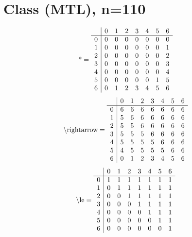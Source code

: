 \documentclass[11pt]{article}
\begin{document}
\section{Class (MTL), n=110}
\[\text{*} = 
\begin{array}{r | r r r r r r r}
 & 0 & 1 & 2 & 3 & 4 & 5 & 6 \\ \hline
0 & 0 & 0 & 0 & 0 & 0 & 0 & 0 \\
1 & 0 & 0 & 0 & 0 & 0 & 0 & 1 \\
2 & 0 & 0 & 0 & 0 & 0 & 0 & 2 \\
3 & 0 & 0 & 0 & 0 & 0 & 0 & 3 \\
4 & 0 & 0 & 0 & 0 & 0 & 0 & 4 \\
5 & 0 & 0 & 0 & 0 & 0 & 1 & 5 \\
6 & 0 & 1 & 2 & 3 & 4 & 5 & 6 \\
\end{array}
\]
\[\text{\textbackslash rightarrow} = 
\begin{array}{r | r r r r r r r}
 & 0 & 1 & 2 & 3 & 4 & 5 & 6 \\ \hline
0 & 6 & 6 & 6 & 6 & 6 & 6 & 6 \\
1 & 5 & 6 & 6 & 6 & 6 & 6 & 6 \\
2 & 5 & 5 & 6 & 6 & 6 & 6 & 6 \\
3 & 5 & 5 & 5 & 6 & 6 & 6 & 6 \\
4 & 5 & 5 & 5 & 5 & 6 & 6 & 6 \\
5 & 4 & 5 & 5 & 5 & 5 & 6 & 6 \\
6 & 0 & 1 & 2 & 3 & 4 & 5 & 6 \\
\end{array}
\]
\[\text{\textbackslash le} = 
\begin{array}{r | r r r r r r r}
 & 0 & 1 & 2 & 3 & 4 & 5 & 6 \\ \hline
0 & 1 & 1 & 1 & 1 & 1 & 1 & 1 \\
1 & 0 & 1 & 1 & 1 & 1 & 1 & 1 \\
2 & 0 & 0 & 1 & 1 & 1 & 1 & 1 \\
3 & 0 & 0 & 0 & 1 & 1 & 1 & 1 \\
4 & 0 & 0 & 0 & 0 & 1 & 1 & 1 \\
5 & 0 & 0 & 0 & 0 & 0 & 1 & 1 \\
6 & 0 & 0 & 0 & 0 & 0 & 0 & 1 \\
\end{array}
\]
\end{document}
